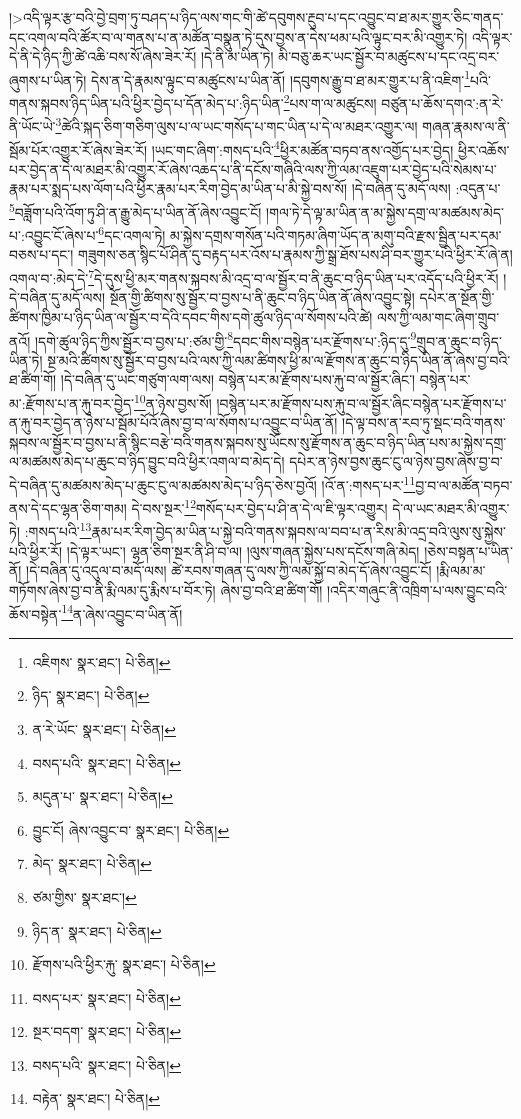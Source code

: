  །>འདི་ལྟར་རྩ་བའི་བྱེ་བྲག་ཏུ་བཤད་པ་ཉིད་ལས་གང་གི་ཚེ་དབུགས་རྔུབ་པ་དང་འབྱུང་བ་ཐ་མར་གྱུར་ཅིང་གནད་དང་འགལ་བའི་ཚོར་བ་ལ་གནས་པ་ན་མཚོན་བསྣུན་ཏེ་དུས་བྱས་ན་དེས་ཕམ་པའི་ལྟུང་བར་མི་འགྱུར་ཏེ། འདི་ལྟར་དེ་ནི་དེ་ཉིད་ཀྱི་ཚེ་འཆི་བས་སོ་ཞེས་ཟེར་རོ། །དེ་ནི་མ་ཡིན་ཏེ། མི་བཅུ་ཆར་ཡང་སྦྱོར་བ་མཚུངས་པ་དང་འདྲ་བར་ཞུགས་པ་ཡིན་ཏེ། དེས་ན་དེ་རྣམས་ལྟུང་བ་མཚུངས་པ་ཡིན་ནོ། །དབུགས་རྒྱུ་བ་ཐ་མར་གྱུར་པ་ནི་འཇིག་\footnote{འཇིགས་  སྣར་ཐང་།  པེ་ཅིན། }པའི་གནས་སྐབས་ཉིད་ཡིན་པའི་ཕྱིར་བྱེད་པ་དོན་མེད་པ་:ཉིད་ཡིན་\footnote{ཉིད་  སྣར་ཐང་།  པེ་ཅིན། }པས་ག་ལ་མཚུངས། བཙུན་པ་ཆོས་དགའ་:ན་རེ་ནི་ཡོང་ཡེ་\footnote{ན་རེ་ཡོང་  སྣར་ཐང་།  པེ་ཅིན། }ཚེའི་སྐད་ཅིག་གཅིག་ལུས་པ་ལ་ཡང་གསོད་པ་གང་ཡིན་པ་དེ་ལ་མཐར་འགྱུར་ལ། གཞན་རྣམས་ལ་ནི་སྦོམ་པོར་འགྱུར་རོ་ཞེས་ཟེར་རོ། །ཡང་གང་ཞིག་:གསད་པའི་\footnote{བསད་པའི་  སྣར་ཐང་།  པེ་ཅིན། }ཕྱིར་མཚོན་བཏབ་ནས་འགྱོད་པར་བྱེད། ཕྱིར་འཆོས་པར་བྱེད་ན་དེ་ལ་མཐར་མི་འགྱུར་རོ་ཞེས་འཆད་པ་ནི་དངོས་གཞིའི་ལས་ཀྱི་ལམ་འཇུག་པར་བྱེད་པའི་སེམས་པ་རྣམ་པར་སྨད་པས་ལོག་པའི་ཕྱིར་རྣམ་པར་རིག་བྱེད་མ་ཡིན་པ་མི་སྐྱེ་བས་སོ། །དེ་བཞིན་དུ་མདོ་ལས། :འདུན་པ་\footnote{མདུན་པ་  སྣར་ཐང་།  པེ་ཅིན། }བཟློག་པའི་འོག་ཏུ་ཤི་ན་རྒྱུ་མེད་པ་ཡིན་ནོ་ཞེས་འབྱུང་ངོ། །གལ་ཏེ་དེ་ལྟ་མ་ཡིན་ན་མ་སྐྱེས་དགྲ་ལ་མཚམས་མེད་པ་:འབྱུང་ངོ་ཞེས་པ་\footnote{བྱུང་ངོ། ཞེས་འབྱུང་བ་  སྣར་ཐང་།  པེ་ཅིན། }དང་འགལ་ཏེ། མ་སྐྱེས་དགྲས་གསོན་པའི་གཏམ་ཞིག་ཡོད་ན་མགུ་བའི་རྫས་སྦྱིན་པར་དམ་བཅས་པ་དང་། གཟུགས་ཅན་སྙིང་པོ་ཤིན་དུ་བརྟད་པར་འོས་པ་རྣམས་ཀྱི་སྒྲ་ཐོས་པས་ཤི་བར་གྱུར་པའི་ཕྱིར་རོ་ཞེ་ན། འགལ་བ་:མེད་དེ་\footnote{མེད་  སྣར་ཐང་།  པེ་ཅིན། }དེ་དུས་ཕྱི་མར་གནས་སྐབས་མི་འདྲ་བ་ལ་སྦྱོར་བ་ནི་ཆུང་བ་ཉིད་ཡིན་པར་འདོད་པའི་ཕྱིར་རོ། །དེ་བཞིན་དུ་མདོ་ལས། སྔོན་གྱི་ཚིགས་སུ་སྦྱོར་བ་བྱས་པ་ནི་ཆུང་བ་ཉིད་ཡིན་ནོ་ཞེས་འབྱུང་སྟེ། དཔེར་ན་སྔོན་གྱི་ཚིགས་ཁྱིམ་པ་ཉིད་ཡིན་ལ་སྦྱོར་བ་དེའི་དབང་གིས་དགེ་ཚུལ་ཉིད་ལ་སོགས་པའི་ཚེ། ལས་ཀྱི་ལམ་གང་ཞིག་གྲུབ་ནའོ། །དགེ་ཚུལ་ཉིད་ཀྱིས་སྦྱོར་བ་བྱས་པ་:ཙམ་གྱི་\footnote{ཙམ་གྱིས་  སྣར་ཐང་། }དབང་གིས་བསྙེན་པར་རྫོགས་པ་:ཉིད་དུ་\footnote{ཉིད་ན་  སྣར་ཐང་།  པེ་ཅིན། }གྲུབ་ན་ཆུང་བ་ཉིད་ཡིན་ཏེ། སྔ་མའི་ཚིགས་སུ་སྦྱོར་བ་བྱས་པའི་ལས་ཀྱི་ལམ་ཚིགས་ཕྱི་མ་ལ་རྫོགས་ན་ཆུང་བ་ཉིད་ཡིན་ནོ་ཞེས་བྱ་བའི་ཐ་ཚིག་གོ། །དེ་བཞིན་དུ་ཡང་གཙུག་ལག་ལས། བསྙེན་པར་མ་རྫོགས་པས་རྐུ་བ་ལ་སྦྱོར་ཞིང་། བསྙེན་པར་མ་:རྫོགས་པ་ན་རྐུ་བར་བྱེད་\footnote{རྫོགས་པའི་ཕྱིར་རྐུ་  སྣར་ཐང་།  པེ་ཅིན། }ན་ཉེས་བྱས་སོ། །བསྙེན་པར་མ་རྫོགས་པས་རྐུ་བ་ལ་སྦྱོར་ཞིང་བསྙེན་པར་རྫོགས་པ་ན་རྐུ་བར་བྱེད་ན་ཉེས་པ་སྦོམ་པོའོ་ཞེས་བྱ་བ་ལ་སོགས་པ་འབྱུང་བ་ཡིན་ནོ། །དེ་ལྟ་བས་ན་རབ་ཏུ་སྡང་བའི་གནས་སྐབས་ལ་སྦྱོར་བ་བྱས་པ་ནི་སྙིང་བརྩེ་བའི་གནས་སྐབས་སུ་ཡོངས་སུ་རྫོགས་ན་ཆུང་བ་ཉིད་ཡིན་པས་མ་སྐྱེས་དགྲ་ལ་མཚམས་མེད་པ་ཆུང་བ་ཉིད་བྱུང་བའི་ཕྱིར་འགལ་བ་མེད་དེ། དཔེར་ན་ཉེས་བྱས་ཆུང་ངུ་ལ་ཉེས་བྱས་ཞེས་བྱ་བ་དེ་བཞིན་དུ་མཚམས་མེད་པ་ཆུང་ངུ་ལ་མཚམས་མེད་པ་ཉིད་ཅེས་བྱའོ། །འོ་ན་:གསད་པར་\footnote{བསད་པར་  སྣར་ཐང་།  པེ་ཅིན། }བྱ་བ་ལ་མཚོན་བཏབ་ནས་དེ་དང་ལྷན་ཅིག་གམ། དེ་བས་སྔར་\footnote{སྔར་བདག་  སྣར་ཐང་།  པེ་ཅིན། }གསོད་པར་བྱེད་པ་ཤི་ན་དེ་ལ་ཇི་ལྟར་འགྱུར། དེ་ལ་ཡང་མཐར་མི་འགྱུར་ཏེ། :གསད་པའི་\footnote{བསད་པའི་  སྣར་ཐང་།  པེ་ཅིན། }རྣམ་པར་རིག་བྱེད་མ་ཡིན་པ་སྐྱེ་བའི་གནས་སྐབས་ལ་བབ་པ་ན་རིས་མི་འདྲ་བའི་ལུས་སུ་སྐྱེས་པའི་ཕྱིར་རོ། །དེ་ལྟར་ཡང་། ལྷན་ཅིག་སྔར་ནི་ཤི་བ་ལ། །ལུས་གཞན་སྐྱེས་པས་དངོས་གཞི་མེད། །ཅེས་བསྟན་པ་ཡིན་ནོ། །དེ་བཞིན་དུ་འདུལ་བ་མདོ་ལས། ཚེ་རབས་གཞན་དུ་ལས་ཀྱི་ལམ་སྐྱོ་བ་མེད་དོ་ཞེས་འབྱུང་ངོ། །རྨི་ལམ་མ་གཏོགས་ཞེས་བྱ་བ་ནི་རྨི་ལམ་དུ་རྨིས་པ་བོར་ཏེ། ཞེས་བྱ་བའི་ཐ་ཚིག་གོ། །འདིར་གཞུང་ནི་འཁྲིག་པ་ལས་བྱུང་བའི་ཆོས་བསྟེན་\footnote{བརྟེན་  སྣར་ཐང་།  པེ་ཅིན། }ན་ཞེས་འབྱུང་བ་ཡིན་ནོ། 